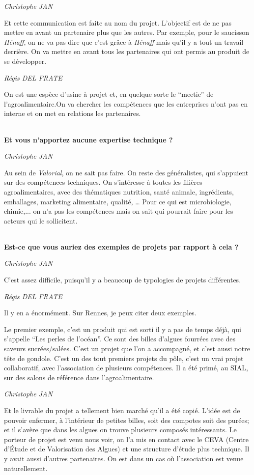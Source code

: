 \documentclass[a4paper,12pt]{report}
\begin{document}
	\emph{Christophe JAN}
	
    Et cette communication est faite au nom du projet. L’objectif est de ne pas mettre en avant un partenaire plus que les autres. Par exemple, pour le saucisson \textit{Hénaff}, on ne va pas dire que c’est grâce à \textit{Hénaff} mais qu’il y a tout un travail derrière. On va mettre en avant tous les partenaires qui ont permis au produit de se développer.

	\emph{Régis DEL FRATE}

    On est une espèce d’usine à projet et, en quelque sorte le “meetic” de l’agroalimentaire.On va chercher les compétences que les entreprises n’ont pas en interne et on met en relations les partenaires.

	\textbf{\\Et vous n’apportez aucune expertise technique ?}

	\emph{Christophe JAN}
	
    Au sein de \textit{Valorial}, on ne sait pas faire. On reste des généralistes, qui s’appuient sur des compétences techniques. On s’intéresse à toutes les filières agroalimentaires, avec des thématiques nutrition, santé animale, ingrédients, emballages, marketing alimentaire, qualité, … Pour ce qui est microbiologie, chimie,... on n’a pas les compétences mais on sait qui pourrait faire pour les acteurs qui le sollicitent.

	\textbf{\\Est-ce que vous auriez des exemples de projets par rapport à cela ?}

	\emph{Christophe JAN}

    C’est assez difficile, puisqu’il y a beaucoup de typologies de projets différentes.

	\emph{Régis DEL FRATE}
	
    Il y en a énormément. Sur Rennes, je peux citer deux exemples.
    
    Le premier exemple, c’est un produit qui est sorti il y a pas de temps déjà, qui s’appelle “Les perles de l’océan”. Ce sont des billes d’algues fourrées avec des saveurs sucrées/salées. C’est un projet que l’on a accompagné, et c’est aussi notre tête de gondole. C’est un des tout premiers projets du pôle, c’est un vrai projet collaboratif, avec l’association de plusieurs compétences. Il a été primé, au SIAL, sur des salons de référence dans l’agroalimentaire.

	\emph{Christophe JAN}
	
    Et le livrable du projet a tellement bien marché qu’il a été copié. L’idée est de pouvoir enfermer, à l’intérieur de petites billes, soit des compotes soit des purées; et il s’avère que dans les algues on trouve plusieurs composés intéressants. Le porteur de projet est venu nous voir, on l’a mis en contact avec le CEVA (Centre d’Étude et de Valorisation des Algues) et une structure d’étude plus technique. Il y avait aussi d’autres partenaires. On est dans un cas où l’association est venue naturellement. 
\end{document}
